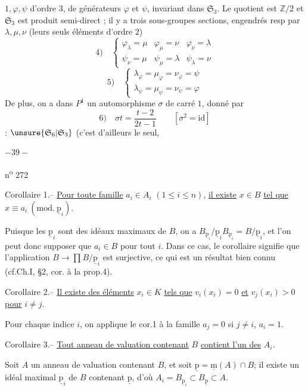 $1,\varphi,\psi$  d'ordre $3$, de générateurs $\varphi$ et $\psi$, invariant dans $\mathfrak S_3$. Le quotient est $\mathbb Z/2$ et $\mathfrak S_3$ est produit semi-direct ; il y a trois sous-groupes sections, engendrés resp par $\lambda,\mu,\nu$ (leurs seuls éléments d'ordre $2$)
\[
4)\quad\left\{\begin{array}{lll}\varphi_\lambda=\mu&\varphi_\mu=\nu&\varphi_\nu=\lambda\\\psi_\nu=\mu&\psi_\mu=\lambda&\psi_\lambda=\nu\end{array}\right.
\]
\[
5)\quad\left\{\begin{array}{l}\lambda_\varphi=\mu_\varphi=\nu_\varphi=\psi\\\lambda_\psi=\mu_\psi=\nu_\psi=\varphi\end{array}\right.
\]
De plus, on a dans $P^1$ un automorphisme $\sigma$  de carré $1$, donné par
\[
6)\quad\sigma t=\frac{t-2}{2t-1}\qquad[\sigma^2=\mathrm{id}]
\]
 : $\unsure{\mathfrak S_6|\mathfrak S_3}$ (c'est d'ailleurs le seul, 


\begin{center}$-39-$\end{center}\hfill n\textsuperscript{o} 272

Corollaire 1.-- \uline{Pour toute famille} $a_i\in A_i$ $(1\leqslant i\leqslant n)$, \uline{il existe} $x\in B$ \uline{tel que} $x\equiv a_i\ (\mathrm{mod.}\ \underline{\mathrm p}_i)$.

Puisque les $\underline{\mathrm p}_i$ sont des idéaux maximaux de $B$, on a $B_{\underline{\mathrm p}_i}/\underline{\mathrm p}_iB_{\underline{\mathrm p}_i}=B/\underline{\mathrm p}_i$, et l'on peut donc supposer que $a_i\in B$ pour tout $i$. Dans ce cas, le corollaire signifie que l'application $B\longrightarrow\prod B/\underline{\mathrm p}_i$ est surjective, ce qui est un résultat bien connu (cf.Ch.I, \S2, cor. à la prop.4).

Corollaire 2.-- \uline{Il existe des éléments} $x_i\in K$ \uline{tels que} $v_i(x_i)=0$ \uline{et} $v_j(x_i)>0$ \uline{pour} $i\ne j$.

Pour chaque indice $i$, on applique le cor.1 à la famille $a_j=0$ si $j\ne i$, $a_i=1$.

Corollaire 3.-- \uline{Tout anneau de valuation contenant} $B$ \uline{contient l'un des} $A_i$.

Soit $A$ un anneau de valuation contenant $B$, et soit $\underline{\mathrm p}=\underline{\mathrm m}(A)\cap B$; il existe un idéal maximal $\underline{\mathrm p}_i$ de $B$ contenant $\underline{\mathrm p}$, d'où $A_i=B_{\underline{\mathrm p}_i}\subset B_{\underline{\mathrm p}}\subset A$.

